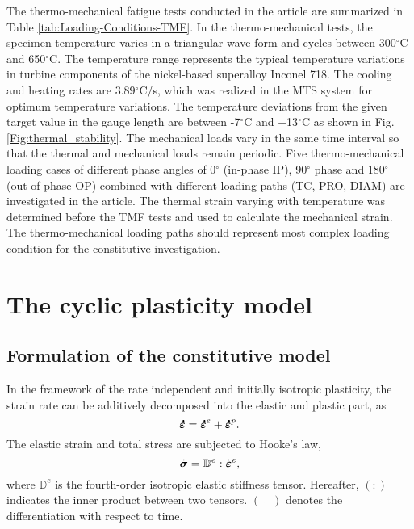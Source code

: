 \documentclass[preprint,5p,twocolumn,11pt,sort&compress]{elsarticle}
\newcommand{\bfsigma}{{\mbox{\boldmath{$\sigma$}}}}
\newcommand{\bfepsilon}{{\mbox{\boldmath{$\varepsilon$}}}}
\newcommand{\dotbfepsilon}{{\mbox{\boldmath{$\dot\varepsilon$}}}}
\begin{document}
The thermo-mechanical fatigue tests conducted in the article are summarized in Table \ref{tab:Loading-Conditions-TMF}.
In the thermo-mechanical tests, the specimen temperature varies in a triangular wave form and cycles between 300$^{\circ}$C and 650$^{\circ}$C. The temperature range represents the typical temperature variations in turbine components of the nickel-based superalloy Inconel 718. The cooling and heating rates are 3.89$^{\circ}$C/s, which was realized in the MTS system for optimum temperature variations.  The temperature deviations from the given target value in the gauge length are between -7$^{\circ}$C and +13$^{\circ}$C as shown in Fig. \ref{Fig:thermal_stability}. The mechanical loads vary in the same time interval so that the thermal and mechanical loads remain periodic.  Five thermo-mechanical loading cases of different phase angles of 0$^{\circ}$ (in-phase IP), 90$^{\circ}$ phase and 180$^{\circ}$ (out-of-phase OP) combined with different loading paths (TC, PRO, DIAM) are investigated in the article.
The thermal strain varying with temperature was determined before the TMF tests and used to calculate the mechanical strain. The thermo-mechanical loading paths should represent most complex loading condition for the constitutive investigation.


\section{The cyclic plasticity model}

\subsection{Formulation of the constitutive model}
\noindent
In the framework of the rate independent and initially isotropic plasticity, the strain rate can be additively decomposed into the elastic and plastic  part, as
\begin{equation}
\dotbfepsilon = {\dotbfepsilon}^e + {\dotbfepsilon}^p.
\end{equation}
The elastic strain and total stress are subjected to Hooke's law,
\begin{equation}
{\dot\bfsigma} = {\mathbb{D}^e}:{\dot\bfepsilon^e},
\label{Equ:HookesLaw}
\end{equation}
where ${\mathbb{D}^e}$ is the fourth-order isotropic elastic stiffness tensor. Hereafter, $(:)$ indicates the inner product between two tensors. $(\dot{\quad})$ denotes the differentiation with respect to time.
\end{document}
